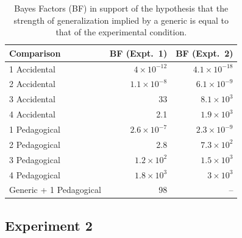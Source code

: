 \documentclass[10pt,letterpaper]{article}
\begin{document}
\begin{center}

\begin{table}[ht]
\centering
\begin{tabular}{lrr}
  \hline
 Comparison & BF (Expt.~1) & BF (Expt.~2)  \\ 
  \hline
 1 Accidental & $4\times 10^{-12}$ & $4.1\times 10^{-18}$ \\ 
 2 Accidental & $1.1\times 10^{-8}$ & $6.1\times 10^{-9}$ \\ 
 3 Accidental &  33 & $8.1\times 10^3$ \\ 
 4 Accidental & 2.1 & $1.9\times 10^3$ \\ 
 1 Pedagogical & $2.6\times 10^{-7}$ & $2.3\times 10^{-9}$ \\ 
 2 Pedagogical & 2.8 & $7.3\times 10^2$ \\ 
 3 Pedagogical & $1.2\times 10^2 $& $1.5\times 10^3$ \\ 
 4 Pedagogical & $1.8 \times 10^3$ & $3\times 10^3$ \\ 
 Generic + 1 Pedagogical &  98 & -- \\ 
   \hline
\end{tabular}
     \caption{Bayes Factors (BF) in support of the hypothesis that the strength of generalization implied by a generic is equal to that of the experimental condition.}
     \vspace{-0.5cm}
\end{table}
       \label{tab:nobsBF}
\end{center}




\subsection{Experiment 2}
\end{document}

